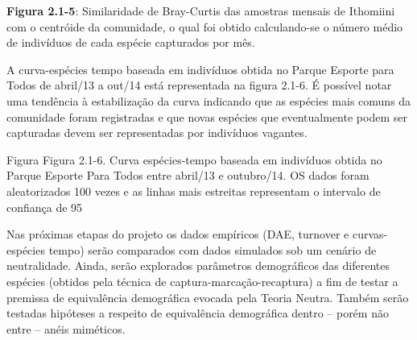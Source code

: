 \textbf{Figura 2.1-5}: Similaridade de Bray-Curtis das amostras mensais de Ithomiini com o centróide da comunidade, o qual foi obtido calculando-se o número médio de indivíduos de cada espécie capturados por mês.

A curva-espécies tempo baseada em indivíduos obtida no Parque Esporte para Todos de abril/13 a out/14 está representada na figura 2.1-6. É possível notar uma tendência à estabilização da curva indicando que as espécies mais comuns da comunidade foram registradas e que novas espécies que eventualmente podem ser capturadas devem ser representadas por indivíduos vagantes.

Figura
Figura 2.1-6. Curva espécies-tempo baseada em indivíduos obtida no Parque Esporte Para Todos entre abril/13 e outubro/14. OS dados foram aleatorizados 100 vezes e as linhas mais estreitas representam o intervalo de confiança de 95%

Nas próximas etapas do projeto os dados empíricos (DAE, turnover e curvas-espécies tempo) serão comparados com dados simulados sob um cenário de neutralidade. Ainda, serão explorados parâmetros demográficos das diferentes espécies (obtidos pela técnica de captura-marcação-recaptura) a fim de testar a premissa de equivalência demográfica evocada pela Teoria Neutra. Também serão testadas hipóteses a respeito de equivalência demográfica dentro – porém não entre – anéis miméticos.